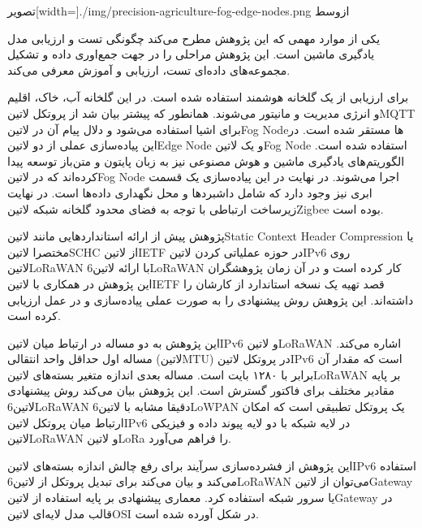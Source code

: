 ‌تصویر[width=\textwidth]{./img/precision-agriculture-fog-edge-nodes.png}
‌ازوسط

یکی از موارد مهمی که این پژوهش مطرح می‌کند چگونگی تست و ارزیابی مدل یادگیری ماشین است. این پژوهش مراحلی را در جهت جمع‌اوری داده و تشکیل مجموعه‌های داده‌ای تست، ارزیابی و آموزش معرفی می‌کند.

برای ارزیابی از یک گلخانه هوشمند استفاده شده است. در این گلخانه آب، خاک، اقلیم و انرژی مدیریت و مانیتور می‌شوند. همانطور که پیشتر بیان شد از پروتکل ‌لاتین{MQTT} برای اشیا استفاده می‌شود و دلال پیام آن
در ‌لاتین{Fog Node}ها مستقر شده است. در این پیاده‌سازی عملی از دو ‌لاتین{Edge Node} و یک ‌لاتین{Fog Node} استفاده شده است. الگوریتم‌های یادگیری ماشین و هوش مصنوعی نیز به زبان پایتون و متن‌باز
توسعه پیدا کرده‌اند که در ‌لاتین{Fog Node} اجرا می‌شوند. در نهایت در این پیاده‌سازی یک قسمت ابری نیز وجود دارد که شامل داشبردها و محل نگهداری داده‌ها است. در نهایت زیرساخت ارتباطی با توجه به فضای محدود گلخانه شبکه
‌لاتین{Zigbee} بوده است.


پژوهش  پیش از ارائه استانداردهایی مانند ‌لاتین{Static Context Header Compression} یا مختصرا ‌لاتین{SCHC} از ‌لاتین{IETF} در حوزه عملیاتی کردن ‌لاتین{IPv6} روی ‌لاتین{LoRaWAN}
با ارائه ‌لاتین{6LoRaWAN} کار کرده است و در آن زمان پژوهشگران این پژوهش در همکاری با ‌لاتین{IETF} قصد تهیه یک نسخه استاندارد از کارشان را داشته‌اند. این پژوهش روش پیشنهادی را به صورت عملی پیاده‌سازی و در عمل ارزیابی کرده است.

این پژوهش به دو مساله در ارتباط میان ‌لاتین{IPv6} و ‌لاتین{LoRaWAN} اشاره می‌کند. مساله اول حداقل واحد انتقالی (‌لاتین{MTU}) در پروتکل ‌لاتین{IPv6} است که مقدار آن برابر با ۱۲۸۰ بایت است.
مساله بعدی اندازه متغیر بسته‌های ‌لاتین{LoRaWAN} بر پایه مقادیر مختلف برای فاکتور گسترش است. این پژوهش بیان می‌کند روش پیشنهادی ‌لاتین{6LoRaWAN}
دقیقا مشابه با ‌لاتین{6LoWPAN} یک پروتکل تطبیقی است که امکان ارتباط میان پروتکل ‌لاتین{IPv6} در لایه شبکه با دو لایه پیوند داده و فیزیکی ‌لاتین{LoRaWAN} و ‌لاتین{LoRa} را فراهم می‌آورد.

این پژوهش از فشرده‌سازی سرآیند برای رفع چالش اندازه بسته‌های ‌لاتین{IPv6} استفاده می‌کند و بیان می‌کند برای تبدیل پروتکل از ‌لاتین{6LoRaWAN} می‌توان از ‌لاتین{Gateway} یا سرور شبکه استفاده کرد.
معماری پیشنهادی بر پایه استفاده از ‌لاتین{Gateway} در قالب مدل لایه‌ای ‌لاتین{OSI} در شکل  آورده شده است.

